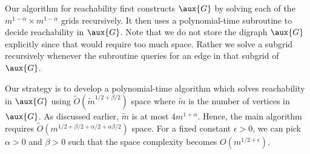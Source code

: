 \documentclass{toc}
\begin{document}
Our algorithm for reachability first constructs $\aux{G}$ by solving each of the $m^{1-\alpha} \times m^{1-\alpha}$ grids recursively. It then uses a polynomial-time subroutine to decide reachability in $\aux{G}$. Note that we do not store 
the 
digraph %
$\aux{G}$ explicitly since that would require too much space. Rather we solve a subgrid recursively whenever the subroutine queries for an edge in that subgrid of $\aux{G}$.

Our strategy is to develop a polynomial-time %
algorithm which solves reachability in $\aux{G}$ using $\tilde{O}(\tilde{m}^{1/2 + \beta/2})$ space where $\tilde{m}$ is the number of vertices in $\aux{G}$. As discussed earlier, $\tilde{m}$ %
is %
 at most $4m^{1 + \alpha}$. Hence, the main algorithm requires 
$\tilde{O}(m^{1/2 + \beta/2 + \alpha/2 + \alpha\beta/2})$ space. For a fixed constant $\epsilon > 0$, we can pick $\alpha > 0$ and $\beta > 0$ such that the space complexity becomes $O(m^{1/2 + \epsilon})$.

%
%
%
%
\end{document}
